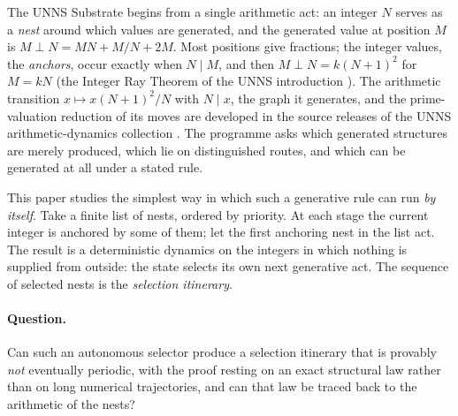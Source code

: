 \documentclass[11pt,a4paper]{article}
\theoremstyle{definition}
\newcommand{\nest}{\mathbin{\perp}}
\begin{document}
The UNNS Substrate begins from a single arithmetic act: an integer $N$ serves as a \emph{nest} around which values are generated, and the generated value at position $M$ is $M\nest N = MN + M/N + 2M$. Most positions give fractions; the integer values, the \emph{anchors}, occur exactly when $N\mid M$, and then $M\nest N = k(N+1)^2$ for $M=kN$ (the Integer Ray Theorem of the UNNS introduction \cite{unns-intro}). The arithmetic transition $x\mapsto x(N+1)^2/N$ with $N\mid x$, the graph it generates, and the prime-valuation reduction of its moves are developed in the source releases of the UNNS arithmetic-dynamics collection \cite{ad-collection,u4gen,u2001}. The programme asks which generated structures are merely produced, which lie on distinguished routes, and which can be generated at all under a stated rule.

This paper studies the simplest way in which such a generative rule can run \emph{by itself}. Take a finite list of nests, ordered by priority. At each stage the current integer is anchored by some of them; let the first anchoring nest in the list act. The result is a deterministic dynamics on the integers in which nothing is supplied from outside: the state selects its own next generative act. The sequence of selected nests is the \emph{selection itinerary}.

\paragraph{Question.} Can such an autonomous selector produce a selection itinerary that is provably \emph{not} eventually periodic, with the proof resting on an exact structural law rather than on long numerical trajectories, and can that law be traced back to the arithmetic of the nests?
\end{document}
